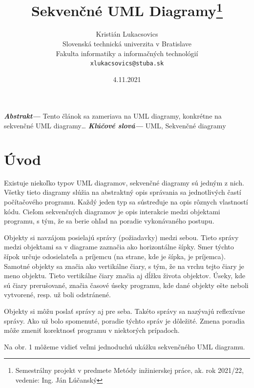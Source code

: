 \documentclass[10pt,twoside,slovak,a4paper]{article}
\title{Sekvenčné UML Diagramy\thanks{Semestrálny projekt v predmete Metódy inžinierskej práce, ak. rok 2021/22, vedenie: Ing. Ján Lúčanský}}
\author{Kristián Lukacsovics\\[2pt]
    {\small Slovenská technická univerzita v Bratislave}\\
    {\small Fakulta informatiky a informačných technológií}\\
    {\small \texttt{xlukacsovics@stuba.sk}}
    }
\date{\small 4.11.2021} %
\providecommand{\abstr}[1]{\textbf{\textit{Abstrakt---}} #1}
\providecommand{\keywords}[1]{\textbf{\textit{Klúčové slová---}} #1}
\begin{document}
\maketitle

\abstr{Tento článok sa zameriava na UML diagramy, konkrétne na sekvenčné UML diagramy\ldots\newline}
\indent\keywords{UML, Sekvenčné diagramy}

\section{Úvod}

Existuje niekoľko typov UML diagramov, sekvenčné diagramy sú jedným z nich. Všetky tieto diagramy slúžia na
abstraktný opis správania sa jednotlivých častí počítačového programu. Každý jeden typ sa sústreďuje na opis
rôznych vlastností kódu. Cieľom sekvenčných diagramov je opis interakcie medzi objektami programu, s tým, že sa
berie ohľad na poradie vykonávaného postupu. \newline

\noindent Objekty si navzájom posielajú správy (požiadavky) medzi sebou. Tieto
správy medzi objektami sa v diagrame zaznačia ako horizontálne šípky. Smer týchto šípok určuje odosielateľa a
príjemcu (na strane, kde je šípka, je príjemca). Samotné objekty sa značia ako vertikálne čiary, s tým, že
na vrchu tejto čiary je meno objektu. Tieto vertikálne čiary značia aj dĺžku života objektov. Úseky, kde sú
čiary prerušované, značia časové úseky programu, kde dané objekty ešte neboli vytvorené, resp. už boli odstránené. \newline

\noindent Objekty si môžu poslať správy aj pre seba. Takéto správy sa nazývajú reflexívne správy. 
Ako už bolo spomenuté, poradie týchto správ je dôležité. Zmena poradia môže zmeniť korektnosť programu
v niektorých prípadoch.  \newline

\noindent Na obr. 1 môžeme vidieť veľmi jednoduchú ukážku sekvenčného UML diagramu. \newpage
\end{document}

